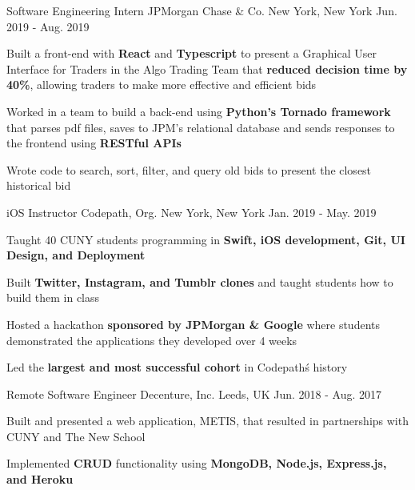 


\begin{cventries}


\cventry
	{Software Engineering Intern}
	{JPMorgan Chase \& Co.}
	{New York, New York}
	{Jun. 2019 - Aug. 2019}
{								
	\begin{cvitems}
        \item {Built a front-end with \textbf{React} and \textbf{Typescript} to present a Graphical User Interface for Traders in the Algo Trading Team that \textbf{reduced decision time by 40\%}, allowing traders to make more effective and efficient bids}
        \item {Worked in a team to build a back-end using \textbf{Python's Tornado framework} that parses pdf files, saves to JPM’s relational database and sends responses to the frontend using \textbf{RESTful APIs}}
        \item {Wrote code to search, sort, filter, and query old bids to present the closest historical bid}
	\end{cvitems}
}

\cventry
{iOS Instructor}
{Codepath, Org.}
{New York, New York}
{Jan. 2019 - May. 2019}
{
\begin{cvitems}
\item {Taught 40 CUNY students programming in \textbf{Swift, iOS development, Git, UI Design, and Deployment}}
\item {Built \textbf{Twitter, Instagram, and Tumblr clones} and taught students how to build them in class}
\item {Hosted a hackathon \textbf{sponsored by JPMorgan \& Google} where students demonstrated the applications they developed over 4 weeks}
\item {Led the \textbf{largest and most successful cohort} in Codepath\'s history}
\end{cvitems}
}

\cventry
{Remote Software Engineer} %
{Decenture, Inc.} %
{Leeds, UK} %
{Jun. 2018 - Aug. 2017} %
{ %
\begin{cvitems}
\item {Built and presented a web application, METIS, that resulted in partnerships with CUNY and The New School}
\item {Implemented \textbf{CRUD} functionality using \textbf{MongoDB, Node.js, Express.js, and Heroku}}
\end{cvitems}
}


\end{cventries}
